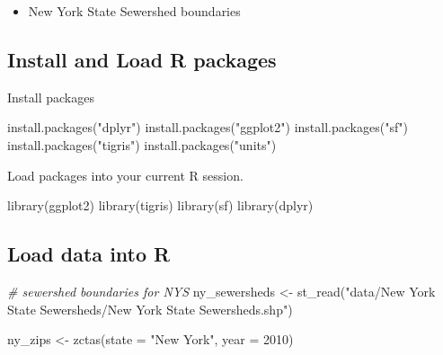 \documentclass[
]{book}
\newenvironment{Shaded}{\begin{snugshade}}{\end{snugshade}}
\newcommand{\AttributeTok}[1]{\textcolor[rgb]{0.77,0.63,0.00}{#1}}
\newcommand{\CommentTok}[1]{\textcolor[rgb]{0.56,0.35,0.01}{\textit{#1}}}
\newcommand{\DecValTok}[1]{\textcolor[rgb]{0.00,0.00,0.81}{#1}}
\newcommand{\FunctionTok}[1]{\textcolor[rgb]{0.00,0.00,0.00}{#1}}
\newcommand{\NormalTok}[1]{#1}
\newcommand{\OtherTok}[1]{\textcolor[rgb]{0.56,0.35,0.01}{#1}}
\newcommand{\StringTok}[1]{\textcolor[rgb]{0.31,0.60,0.02}{#1}}
\providecommand{\tightlist}{%
  \setlength{\itemsep}{0pt}\setlength{\parskip}{0pt}}
\begin{document}
\begin{itemize}
\tightlist
\item
  New York State Sewershed boundaries
\end{itemize}

\hypertarget{install-and-load-r-packages-1}{%
\subsection{Install and Load R packages}\label{install-and-load-r-packages-1}}

Install packages

\begin{Shaded}
\begin{Highlighting}[]
\FunctionTok{install.packages}\NormalTok{(}\StringTok{"dplyr"}\NormalTok{)}
\FunctionTok{install.packages}\NormalTok{(}\StringTok{"ggplot2"}\NormalTok{)}
\FunctionTok{install.packages}\NormalTok{(}\StringTok{"sf"}\NormalTok{)}
\FunctionTok{install.packages}\NormalTok{(}\StringTok{"tigris"}\NormalTok{)}
\FunctionTok{install.packages}\NormalTok{(}\StringTok{"units"}\NormalTok{)}
\end{Highlighting}
\end{Shaded}

Load packages into your current R session.

\begin{Shaded}
\begin{Highlighting}[]
\FunctionTok{library}\NormalTok{(ggplot2)}
\FunctionTok{library}\NormalTok{(tigris)}
\FunctionTok{library}\NormalTok{(sf)}
\FunctionTok{library}\NormalTok{(dplyr)}
\end{Highlighting}
\end{Shaded}

\hypertarget{load-data-into-r}{%
\subsection{Load data into R}\label{load-data-into-r}}

\begin{Shaded}
\begin{Highlighting}[]
\CommentTok{\# sewershed boundaries for NYS}
\NormalTok{ny\_sewersheds }\OtherTok{\textless{}{-}} \FunctionTok{st\_read}\NormalTok{(}\StringTok{"data/New York State Sewersheds/New York State Sewersheds.shp"}\NormalTok{)}

\NormalTok{ny\_zips }\OtherTok{\textless{}{-}} \FunctionTok{zctas}\NormalTok{(}\AttributeTok{state =} \StringTok{"New York"}\NormalTok{, }\AttributeTok{year =} \DecValTok{2010}\NormalTok{)}
\end{Highlighting}
\end{Shaded}
\end{document}

